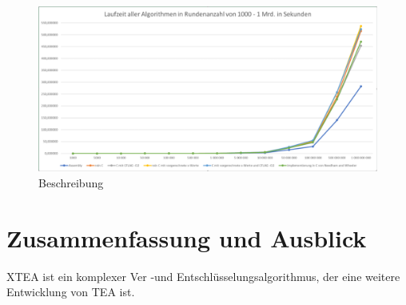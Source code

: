 \documentclass[course=asp]{aspdoc}
\begin{document}
\begin{figure}[h]
\centering
\includegraphics[scale = 0.4]{Analyse.png}
\caption{Beschreibung}
\end{figure}
\newpage

\section{Zusammenfassung und Ausblick}
XTEA ist ein komplexer Ver -und Entschlüsselungsalgorithmus, der eine weitere Entwicklung von TEA ist.
\newpage


{}
\end{document}
